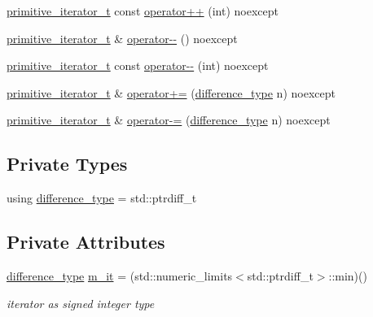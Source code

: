 \begin{DoxyCompactItemize}
\item 
\hyperlink{classnlohmann_1_1detail_1_1primitive__iterator__t}{primitive\+\_\+iterator\+\_\+t} const \hyperlink{classnlohmann_1_1detail_1_1primitive__iterator__t_aa011863621357b3cf891670bf63a48b1}{operator++} (int) noexcept
\item 
\hyperlink{classnlohmann_1_1detail_1_1primitive__iterator__t}{primitive\+\_\+iterator\+\_\+t} \& \hyperlink{classnlohmann_1_1detail_1_1primitive__iterator__t_abecbf0c73c7fe963a699738065177bc3}{operator-\/-\/} () noexcept
\item 
\hyperlink{classnlohmann_1_1detail_1_1primitive__iterator__t}{primitive\+\_\+iterator\+\_\+t} const \hyperlink{classnlohmann_1_1detail_1_1primitive__iterator__t_aef3b5dfeb2cb04dc9d0a024fc1898b98}{operator-\/-\/} (int) noexcept
\item 
\hyperlink{classnlohmann_1_1detail_1_1primitive__iterator__t}{primitive\+\_\+iterator\+\_\+t} \& \hyperlink{classnlohmann_1_1detail_1_1primitive__iterator__t_aee01535df0b3b40137d9241029a9a203}{operator+=} (\hyperlink{classnlohmann_1_1detail_1_1primitive__iterator__t_af3db0d5c90de427d51645fe73a015553}{difference\+\_\+type} n) noexcept
\item 
\hyperlink{classnlohmann_1_1detail_1_1primitive__iterator__t}{primitive\+\_\+iterator\+\_\+t} \& \hyperlink{classnlohmann_1_1detail_1_1primitive__iterator__t_a0bf83ab08abe1ae4b51c790c85cdf151}{operator-\/=} (\hyperlink{classnlohmann_1_1detail_1_1primitive__iterator__t_af3db0d5c90de427d51645fe73a015553}{difference\+\_\+type} n) noexcept
\end{DoxyCompactItemize}
\subsection*{Private Types}
\begin{DoxyCompactItemize}
\item 
using \hyperlink{classnlohmann_1_1detail_1_1primitive__iterator__t_af3db0d5c90de427d51645fe73a015553}{difference\+\_\+type} = std\+::ptrdiff\+\_\+t
\end{DoxyCompactItemize}
\subsection*{Private Attributes}
\begin{DoxyCompactItemize}
\item 
\hyperlink{classnlohmann_1_1detail_1_1primitive__iterator__t_af3db0d5c90de427d51645fe73a015553}{difference\+\_\+type} \hyperlink{classnlohmann_1_1detail_1_1primitive__iterator__t_a4357355113b0cd7e12b15c2e93703510}{m\+\_\+it} = (std\+::numeric\+\_\+limits$<$std\+::ptrdiff\+\_\+t$>$\+::min)()
\begin{DoxyCompactList}\small\item\em iterator as signed integer type \end{DoxyCompactList}\end{DoxyCompactItemize}
